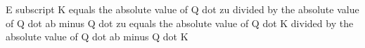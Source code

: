 E subscript K equals the absolute value of Q dot zu divided by the absolute value of Q dot ab minus Q dot zu equals the absolute value of Q dot K divided by the absolute value of Q dot ab minus Q dot K